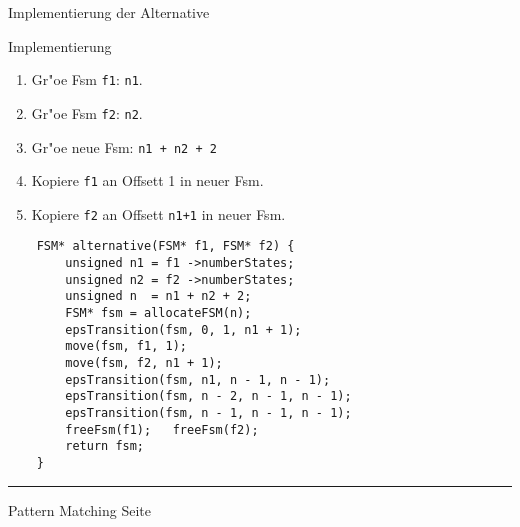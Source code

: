 \begin{slide}{}
\normalsize

\begin{center}
Implementierung der Alternative
\end{center}
\vspace*{0.5cm}

\footnotesize
\hspace*{-1cm}

Implementierung
\begin{enumerate}
\item Gr"o\3e Fsm \texttt{f1}: \texttt{n1}.
\item Gr"o\3e Fsm \texttt{f2}: \texttt{n2}.
\item Gr"o\3e neue Fsm: \texttt{n1 + n2 + 2}
\item Kopiere \texttt{f1} an Offsett 1 in neuer Fsm.
\item Kopiere \texttt{f2} an Offsett \texttt{n1+1} in neuer Fsm.
\end{enumerate}

\begin{verbatim}
    FSM* alternative(FSM* f1, FSM* f2) {
        unsigned n1 = f1 ->numberStates;
        unsigned n2 = f2 ->numberStates;
        unsigned n  = n1 + n2 + 2;
        FSM* fsm = allocateFSM(n);
        epsTransition(fsm, 0, 1, n1 + 1);
        move(fsm, f1, 1);
        move(fsm, f2, n1 + 1);
        epsTransition(fsm, n1, n - 1, n - 1);
        epsTransition(fsm, n - 2, n - 1, n - 1);
        epsTransition(fsm, n - 1, n - 1, n - 1);
        freeFsm(f1);   freeFsm(f2);
        return fsm;
    }
\end{verbatim}


\vspace*{\fill}
\tiny \addtocounter{mypage}{1}
\rule{17cm}{1mm}
Pattern Matching \hspace*{\fill} Seite 
\end{slide}



